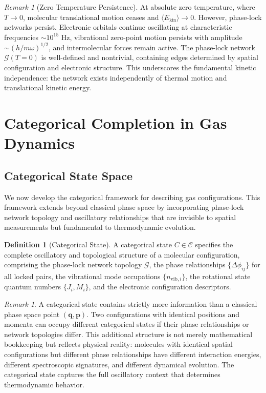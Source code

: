 \documentclass[12pt,a4paper]{article}
\theoremstyle{definition}
\newtheorem{definition}[theorem]{Definition}
\theoremstyle{remark}
\newtheorem{remark}[theorem]{Remark}
\newcommand{\phaselockgraph}{\mathcal{G}}
\newcommand{\catspace}{\mathcal{C}}
\begin{document}
\begin{remark}[Zero Temperature Persistence]
At absolute zero temperature, where $T \to 0$, molecular translational motion ceases and $\langle E_{\text{kin}} \rangle \to 0$. However, phase-lock networks persist. Electronic orbitals continue oscillating at characteristic frequencies $\sim 10^{15}$ Hz, vibrational zero-point motion persists with amplitude $\sim (h/m\omega)^{1/2}$, and intermolecular forces remain active. The phase-lock network $\phaselockgraph(T=0)$ is well-defined and nontrivial, containing edges determined by spatial configuration and electronic structure. This underscores the fundamental kinetic independence: the network exists independently of thermal motion and translational kinetic energy.
\end{remark}

\section{Categorical Completion in Gas Dynamics}
\label{sec:categorical}

\subsection{Categorical State Space}

We now develop the categorical framework for describing gas configurations. This framework extends beyond classical phase space by incorporating phase-lock network topology and oscillatory relationships that are invisible to spatial measurements but fundamental to thermodynamic evolution.

\begin{definition}[Categorical State]
\label{def:categorical_state}
A categorical state $C \in \catspace$ specifies the complete oscillatory and topological structure of a molecular configuration, comprising the phase-lock network topology $\phaselockgraph$, the phase relationships $\{\Delta\phi_{ij}\}$ for all locked pairs, the vibrational mode occupations $\{n_{\text{vib},i}\}$, the rotational state quantum numbers $\{J_i, M_i\}$, and the electronic configuration descriptors.
\end{definition}

\begin{remark}
A categorical state contains strictly more information than a classical phase space point $(\mathbf{q}, \mathbf{p})$. Two configurations with identical positions and momenta can occupy different categorical states if their phase relationships or network topologies differ. This additional structure is not merely mathematical bookkeeping but reflects physical reality: molecules with identical spatial configurations but different phase relationships have different interaction energies, different spectroscopic signatures, and different dynamical evolution. The categorical state captures the full oscillatory context that determines thermodynamic behavior.
\end{remark}
\end{document}

